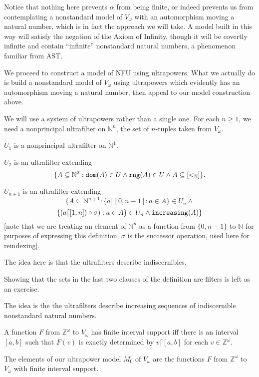 \documentclass{slides}
\begin{document}
\begin{slide}

Notice that nothing here prevents $\alpha$ from being finite, or indeed prevents us from contemplating a nonstandard model of $V_\omega$ with an automorphism moving a natural number, which is in fact the approach we will take.  A model built in this way will satisfy the negation of the Axiom of Infinity, though it will be covertly infinite and contain ``infinite'' nonstandard natural numbers, a phenomenon familiar from AST.

\end{slide}

\begin{slide}

We proceed to construct a model of NFU using ultrapowers.  What we actually do is build a nonstandard model of $V_\omega$ using ultrapowers which evidently has an automorphism moving a natural number, then appeal to our model construction above.

We will use a system of ultrapowers rather than a single one.  For each $n\geq 1$, we need a nonprincipal ultrafilter
on $\mathbb N^n$, the set of $n$-tuples taken from $V_\omega$.

\end{slide}

\begin{slide}

$U_1$ is a nonprincipal ultrafilter on $\mathbb N^1$.

$U_2$ is an ultrafilter extending $$\{A \subseteq \mathbb N^2:{\tt dom}(A) \in U \wedge {\tt rng}(A) \in U \wedge A \subseteq [<_{\mathbb N}]\}.$$

$U_{n+1}$ is an ultrafilter extending $$\{A \subseteq \mathbb N^{n+1}: \{a\lceil [0,n-1]:a \in A\} \in U_n \wedge $$ $$ \{(a \lceil[1,n])\circ \sigma):a \in A\} \in U_n \wedge {\tt increasing}(A)\}$$ [note that we are treating an element of $\mathbb N^n$ as a function from $\{0,n-1\}$ to $\mathbb N$ for purposes of expressing this definition; $\sigma$ is the successor operation, used here for reindexing].

The idea here is that the ultrafilters describe indiscernibles.

\end{slide}

\begin{slide}

Showing that the sets in the last two clauses of the definition are filters is left as an exercise.

The idea is the the ultrafilters describe increasing sequences of indiscernible nonstandard natural numbers.

A function $F$ from $\mathbb Z^\omega$ to $V_\omega$ has finite interval support iff there is an interval
$[a,b]$ such that $F(v)$ is exactly determined by $v\lceil [a,b]$ for each $v \in \mathbb Z^\omega$.

The elements of our ultrapower model $M_0$ of $V_\omega$ are the functions $F$ from $\mathbb Z^\omega$ to $V_\omega$ with finite interval support.

\end{slide}
\end{document}
